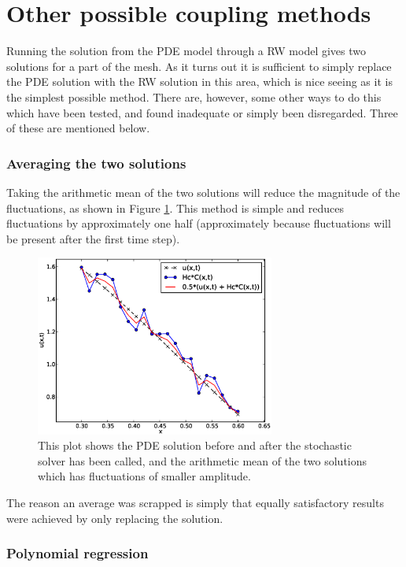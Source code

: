 \section{Other possible coupling methods}\label{other_possible_coupling_methods}

Running the solution from the PDE model through a RW model gives two solutions for a part of the mesh. 
As it turns out it is sufficient to simply replace the PDE solution with the RW solution in this area, which is nice seeing as it is the simplest possible method. 
There are, however, some other ways to do this which have been tested, and found inadequate or simply been disregarded. Three of these are mentioned below. 

\subsubsection{Averaging the two solutions}
 Taking the arithmetic mean of the two solutions will reduce the magnitude of the fluctuations, as shown in Figure \ref{theory:average}. 
 This method is simple and reduces fluctuations by approximately one half (approximately because fluctuations will be present after the first time step). 
 \begin{figure}[h]
  \centering
  \includegraphics[width=0.7\textwidth]{Figures/average.eps}
  \caption[Idea behind averaging solutions]{This plot shows the PDE solution before and after the stochastic solver has been called, and the arithmetic mean of the two solutions which has fluctuations of smaller amplitude.}
  \label{theory:average}
 \end{figure}

 The reason an average was scrapped is simply that equally satisfactory results were achieved by only replacing the solution.
 
\subsubsection{Polynomial regression}

